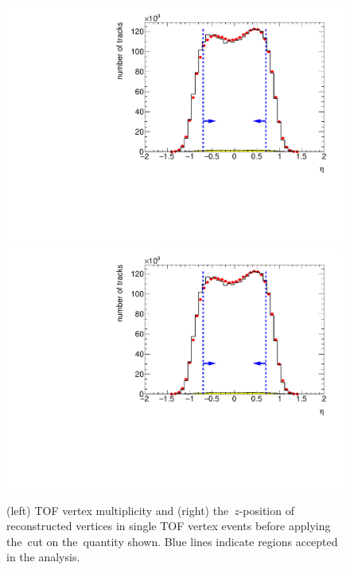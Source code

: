 \begin{figure}[h!]
	\centering
	\includegraphics[width=.49\textwidth, page=13]{chapters/chrgSTAR/img/selection/SDT.pdf}
	\includegraphics[width=.49\textwidth, page=7]{chapters/chrgSTAR/img/selection/SDT.pdf}
	\caption{(left) TOF vertex multiplicity  and  (right) the~$z$-position of  reconstructed vertices in single TOF vertex events before applying  the~cut on the~quantity shown. Blue lines indicate regions accepted in the analysis.}
	\label{fig:vertexSTAR}
\end{figure}

\FloatBarrier